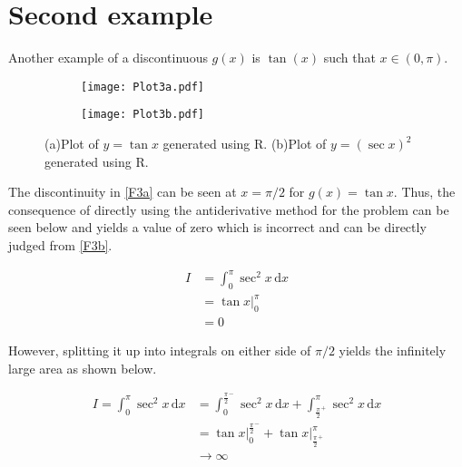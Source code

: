 \section{Second example}

Another example of a discontinuous $g(x)$ is $\tan(x)$ such that $x \in (0, \pi)$.

\begin{figure}[h]
	\centering
	\begin{subfigure}[t]{0.49\textwidth}
		\centering
		\texttt{[image: Plot3a.pdf]}
		\label{F3a}
	\end{subfigure}
	\hfill
	\begin{subfigure}[t]{0.49\textwidth}
		\centering
		\texttt{[image: Plot3b.pdf]}
		\label{F3b}
	\end{subfigure}
	\caption{(a)Plot of $y=\tan{x}$ generated using R. (b)Plot of $y = (\sec{x})^2$ generated using R.}\label{F3}
\end{figure}

The discontinuity in \autoref{F3a} can be seen at $x =\pi/2$ for $g(x) = \tan{x}$. Thus, the consequence of directly using the antiderivative method for the problem can be seen below and yields a value of zero which is incorrect and can be directly judged from \autoref{F3b}.

\begin{align*}
	I &= \int_{0}^{\pi}\sec^2{x}\,\mathrm{d}x \\
	&= \tan{x}\bigg\rvert_{0}^{\pi} \\
	&= 0
\end{align*}

However, splitting it up into integrals on either side of $\pi/2$ yields the infinitely large area as shown below.

\begin{align*}
	I = \int_{0}^{\pi}\sec^2{x}\,\mathrm{d}x &= \int_{0}^{{\frac{\pi}{2}}^-}\sec^2{x}\,\mathrm{d}x + \int_{{\frac{\pi}{2}}^+}^{\pi}\sec^2{x}\,\mathrm{d}x \\
	&= \tan{x}\bigg\rvert_{0}^{{\frac{\pi}{2}}^-} + \tan{x}\bigg\rvert_{{\frac{\pi}{2}}^+}^{\pi} \\
	& \to \infty
\end{align*}